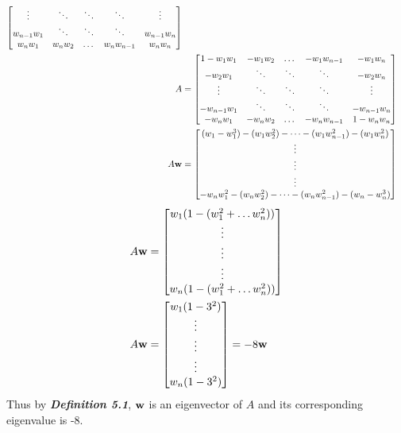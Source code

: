 \documentclass{uofa-eng-assignment}
\begin{document}
\begin{enumerate}
\begin{enumerate}
\begin{align*}
\begin{bmatrix}
	      	      	\vdots      & \ddots   & \ddots & \ddots       & \vdots      \\
	      	      	w_{n-1}w_1  & \ddots   & \ddots & \ddots       & w_{n-1}w_n  \\
	      	      	w_nw_1      & w_n w_2  & \dots  & w_n w_{n-1}  & w_n w_n     
	      	      	\end{bmatrix} \\
	      	      	A &= 
	      	      	\begin{bmatrix}
	      	      	1 - w_1 w_1 & -w_1w_2  & \dots  & -w_1 w_{n-1} & -w_1 w_n    \\
	      	      	-w_2w_1     & \ddots   & \ddots & \ddots       & -w_2 w_n    \\
	      	      	\vdots      & \ddots   & \ddots & \ddots       & \vdots      \\
	      	      	-w_{n-1}w_1 & \ddots   & \ddots & \ddots       & -w_{n-1}w_n \\
	      	      	-w_nw_1     & -w_n w_2 & \dots  & -w_n w_{n-1} & 1 - w_n w_n 
	      	      	\end{bmatrix} \\
	      	      	A\vb{w} &= 
	      	      	\begin{bmatrix}
	      	      	(w_1 - w_1^3)  - (w_1 w_2^2) - \dots - (w_1 w_{n-1}^2) - (w_1 w_n^2)\\
	      	      	\vdots \\ 
	      	      	\vdots \\ 
	      	      	\vdots \\
	      	      	-w_n w_1^2  - (w_n w_2^2) - \dots - (w_n w_{n-1}^2) - (w_n -  w_n^3)\\
	      	      	\end{bmatrix} 
	      	      \end{align*}
	      	      \begin{align*}
	      	      	A\vb{w} & = 
	      	      	\begin{bmatrix}
	      	      	w_1(1 - (w_1^2 + \dots w_n^2)) \\
	      	      	\vdots \\ 
	      	      	\vdots \\ 
	      	      	\vdots \\
	      	      	w_n(1 - (w_1^2 + \dots w_n^2)) \\
	      	      	\end{bmatrix} \\
	      	      	A\vb{w} & = 
	      	      	\begin{bmatrix}
	      	      	w_1(1 - 3^2) \\
	      	      	\vdots \\ 
	      	      	\vdots \\ 
	      	      	\vdots \\
	      	      	w_n(1 - 3^2) \\
	      	      	\end{bmatrix} = -8\vb{w}
	      	      \end{align*}
	      	      Thus by \textbf{\textit{Definition 5.1}}, $\vb{w}$ is an eigenvector of $A$ and its corresponding eigenvalue is -8.
	      	      

\end{enumerate}
\end{enumerate}
\end{document}
